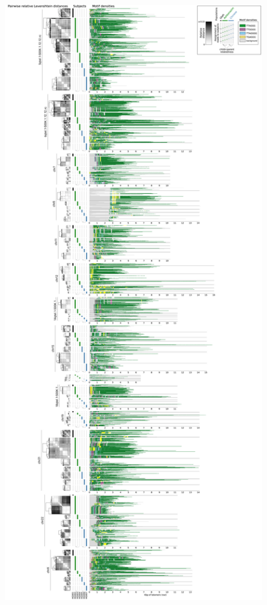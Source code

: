 \documentclass{article}
\begin{document}
                \begin{figure}[h!] \centering %
                \includegraphics[height=.88\textheight,width=\textwidth,keepaspectratio]{renders/figures/Figure-SH.png}

\end{figure}
\end{document}
